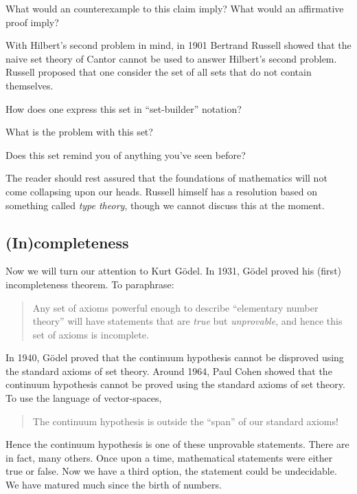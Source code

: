 \documentclass{ximera}
\begin{document}
\begin{question}
What would an counterexample to this claim imply? What would an
affirmative proof imply?
\end{question}

With Hilbert's second problem in mind, in 1901 Bertrand Russell showed
that the naive set theory of Cantor cannot be used to answer Hilbert's
second problem. Russell proposed that one consider the set of all sets
that do not contain themselves.

\begin{question}
How does one express this set in ``set-builder'' notation?
\end{question}

\begin{question}
 What is the problem with this set? 
\end{question}

\begin{question}
Does this set remind you of anything you've seen before?
\end{question}

The reader should rest assured that the foundations of mathematics
will not come collapsing upon our heads. Russell himself has a
resolution based on something called \textit{type theory}, though we
cannot discuss this at the moment.

\subsection*{(In)completeness}


Now we will turn our attention to Kurt G\"odel. In 1931, G\"odel
proved his (first) incompleteness theorem. To paraphrase:
\begin{quote}
Any set of axioms powerful enough to describe ``elementary number
theory'' will have statements that are \textit{true} but
\textit{unprovable}, and hence this set of axioms is incomplete.
\end{quote}

In 1940, G\"odel proved that the continuum hypothesis cannot be
disproved using the standard axioms of set theory. Around 1964, Paul
Cohen showed that the continuum hypothesis cannot be proved using the
standard axioms of set theory. To use the language of vector-spaces,
\begin{quote}
The continuum hypothesis is outside the ``span'' of our standard axioms!
\end{quote}

Hence the continuum hypothesis is one of these unprovable
statements. There are in fact, many others. Once upon a time,
mathematical statements were either true or false. Now we have a third
option, the statement could be undecidable. We have matured much since
the birth of numbers.
\end{document}
